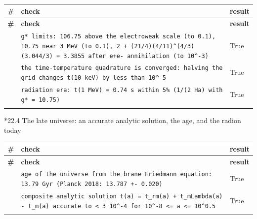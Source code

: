 \documentclass[10pt,a4paper]{article}
\makeatletter
\renewcommand\subsubsection{\@startsection{subsubsection}{3}{\z@}{-3.25ex\@plus -1ex \@minus -.2ex}{1.5ex \@plus .2ex}{\normalfont\normalsize\bfseries\raggedright}}
\makeatother
\begin{document}
{\footnotesize
\begin{longtable}{>{\raggedright\arraybackslash}p{}>{\raggedright\arraybackslash}p{}>{\raggedright\arraybackslash}p{}}
\toprule
\textbf{\#} & \textbf{check} & \textbf{result} \\
\midrule\endfirsthead
\toprule
\textbf{\#} & \textbf{check} & \textbf{result} \\
\midrule\endhead
\endfoot
\bottomrule\endlastfoot
389 & \texttt{g* limits: 106.75 above the electroweak scale (to 0.1), 10.75 near 3 MeV (to 0.1), 2 + (21/\allowbreak{}4)(4/\allowbreak{}11)\textasciicircum{}(4/\allowbreak{}3)(3.044/\allowbreak{}3) = 3.3855 after e+e- annihilation (to 10\textasciicircum{}-3)} & True \\
390 & \texttt{the time-temperature quadrature is converged: halving the grid changes t(10 keV) by less than 10\textasciicircum{}-5} & True \\
391 & \texttt{radiation era: t(1 MeV) = 0.74 s within 5\% (1/\allowbreak{}(2 Ha) with g* = 10.75)} & True \\*
\end{longtable}}
\subsubsection*{22.4 The late universe: an accurate analytic solution, the age, and the radion today}
{\footnotesize
\begin{longtable}{>{\raggedright\arraybackslash}p{}>{\raggedright\arraybackslash}p{}>{\raggedright\arraybackslash}p{}}
\toprule
\textbf{\#} & \textbf{check} & \textbf{result} \\
\midrule\endfirsthead
\toprule
\textbf{\#} & \textbf{check} & \textbf{result} \\
\midrule\endhead
\endfoot
\bottomrule\endlastfoot
392 & \texttt{age of the universe from the brane Friedmann equation: 13.79 Gyr (Planck 2018: 13.787 +- 0.020)} & True \\
393 & \texttt{composite analytic solution t(a) = t\_\allowbreak{}rm(a) + t\_\allowbreak{}mLambda(a) - t\_\allowbreak{}m(a) accurate to < 3 10\textasciicircum{}-4 for 10\textasciicircum{}-8 <= a <= 10\textasciicircum{}0.5} & True \\*
\end{longtable}}
\end{document}

